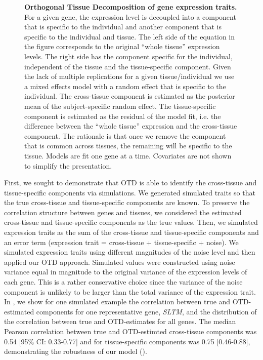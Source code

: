 \documentclass[10pt,letterpaper]{article}
\begin{document}
\begin{figure}[H]
\caption{\textbf{Orthogonal Tissue Decomposition of gene expression traits.} For a given gene, the expression level is decoupled into a component that is specific to the individual and another component that is specific to the individual and tissue. The left side of the equation in the figure corresponds to the original ``whole tissue'' expression levels. The right side has the component specific for the individual, independent of the tissue and the tissue-specific component. Given the lack of multiple replications for a given tissue/individual we use a mixed effects model with a random effect that is specific to the individual. The cross-tissue component is estimated as the posterior mean of the subject-specific random effect. The tissue-specific component is estimated as the residual of the model fit, i.e. the difference between the ``whole tissue'' expression and the cross-tissue component. The rationale is that once we remove the component that is common across tissues, the remaining will be specific to the tissue. Models are fit one gene at a time. Covariates are not shown to simplify the presentation.}
\label{fig-OTD}
\end{figure}


First, we sought to demonstrate that OTD is able to identify the cross-tissue and tissue-specific components via simulations. We generated simulated traits so that the true cross-tissue and tissue-specific components are known. To preserve the correlation structure between genes and tissues, we considered the estimated cross-tissue and tissue-specific components as the true values. Then, we simulated expression traits as the sum of the cross-tissue and tissue-specific components and an error term (expression trait = cross-tissue + tissue-specific + noise). We simulated expression traits using different magnitudes of the noise level and then applied our OTD approach. Simulated values were constructed using noise variance equal in magnitude to the original variance of the expression levels of each gene. This is a rather conservative choice since the variance of the noise component is unlikely to be larger than the total variance of the expression trait.
In , we show for one simulated example the correlation between true and OTD-estimated components for one representative gene, \textit{SLTM}, and the distribution of the correlation between true and OTD-estimates for all genes. The median Pearson correlation between true and OTD-estimted cross-tissue components was 0.54 [95\% CI: 0.33-0.77] and for tissue-specific components was 0.75 [0.46-0.88], demonstrating the robustness of our model ().
\end{document}
